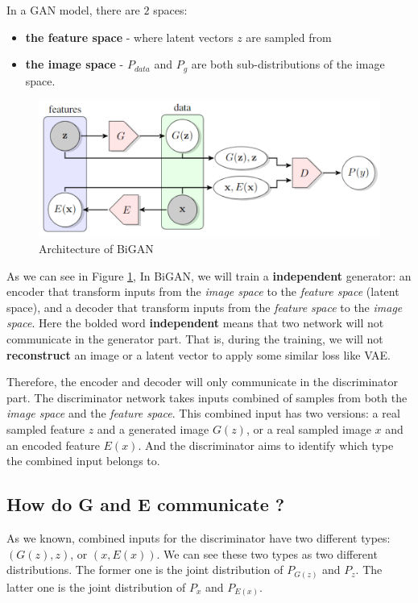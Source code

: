 \documentclass{article} %
\begin{document}
In a GAN model, there are $2$ spaces: 

\begin{itemize}
    \item \textbf{the feature space} - where latent vectors $z$ are sampled from
    \item \textbf{the image space} - $P_{data}$ and $P_g$ are both sub-distributions of the image space.
\end{itemize}

\begin{figure}[h]
	\centering
	\includegraphics[width=0.8\linewidth]{figures/BiGAN.PNG}
	\caption{Architecture of BiGAN}
	\label{fig:BiGAN}
\end{figure}

As we can see in Figure \ref{fig:BiGAN}, In BiGAN, we will train a \textbf{independent} generator: an encoder that transform inputs from the \emph{image space} to the \emph{feature space} (latent space), and a decoder that transform inputs from the \emph{feature space} to the \emph{image space}. Here the bolded word \textbf{independent} means that two network will not communicate in the generator part. That is, during the training, we will not \textbf{reconstruct} an image or a latent vector to apply some similar loss like VAE.

Therefore, the encoder and decoder will only communicate in the discriminator part. The discriminator network takes inputs combined of samples from both the \emph{image space} and the \emph{feature space}. This combined input has two versions: a real sampled feature $z$ and a generated image $G(z)$, or a real sampled image $x$ and an encoded feature $E(x)$. And the discriminator aims to identify which type the combined input belongs to.

\subsection{How do G and E communicate ?}

As we known, combined inputs for the discriminator have two different types: $(G(z), z)$, or $(x, E(x))$. We can see these two types as two different distributions. The former one is the joint distribution of $P_{G(z)}$ and $P_z$. The latter one is the joint distribution of $P_x$ and $P_{E(x)}$. 
\end{document}

